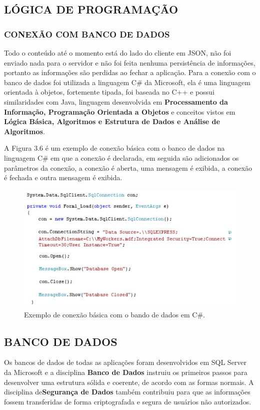 \documentclass[
  12pt,				%
  openany,
  oneside,
  a4paper,			%
  english,			%
  brazil
]{article}
\numberwithin{figure}{section}
\numberwithin{table}{section}
\begin{document}
\subsection{LÓGICA DE PROGRAMAÇÃO}
\subsubsection{CONEXÃO COM BANCO DE DADOS}

Todo o conteúdo até o momento está do lado do cliente em JSON, não foi enviado nada para o servidor e não foi feita nenhuma persistência de informações, portanto as informações são perdidas ao fechar a aplicação. Para a conexão com o banco de dados foi utilizada a linguagem C\# da Microsoft, ela é uma linguagem orientada à objetos, fortemente tipada, foi baseada no C++ e possui similaridades com Java, linguagem desenvolvida em \textbf{Processamento da Informação, Programação Orientada a Objetos} e conceitos vistos em \textbf{Lógica Básica, Algoritmos e Estrutura de Dados e Análise de Algoritmos}.

A Figura 3.6 é um exemplo de conexão básica com o banco de dados na linguagem C\#
em que a conexão é declarada, em seguida são adicionados os parâmetros da conexão, a conexão é aberta, uma mensagem é exibida, a conexão é fechada e outra mensagem é exibida.

\begin{figure}[!h]
\centering
\includegraphics[width=1\textwidth]{figura36}
\caption{Exemplo de conexão básica com o bando de dados em C\#.}
\end{figure}


\subsection{BANCO DE DADOS}

Os bancos de dados de todas as aplicações foram desenvolvidos em SQL Server da Microsoft e a disciplina \textbf{Banco de Dados} instruiu os primeiros passos para desenvolver uma estrutura sólida e coerente, de acordo com as formas normais. A disciplina de\textbf{Segurança de Dados} também contribuiu para que as informações fossem transferidas de forma criptografada e segura de usuários não autorizados.
\end{document}
